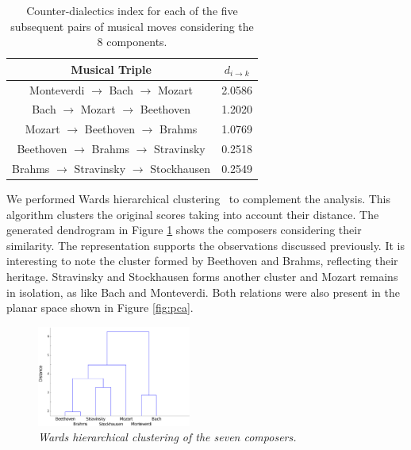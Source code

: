 \documentclass[
 aip,
 jmp,
 amsmath,amssymb,
 reprint,
]{revtex4-1}
\begin{document}
\begin{table}[ht]
\caption{\label{tab:tableE} Counter-dialectics index for each
of the five subsequent pairs of musical moves considering the 8 components.}

\begin{tabular}{|c||c|}
\hline
Musical Triple & $d_{i \rightarrow k}$ \\
\hline \hline

 Monteverdi $\to$ Bach $\to$ Mozart          & 2.0586 \\
 Bach $\to$ Mozart $\to$ Beethoven           & 1.2020 \\
 Mozart $\to$ Beethoven $\to$ Brahms         & 1.0769 \\
 Beethoven $\to$ Brahms $\to$ Stravinsky     & 0.2518 \\
 Brahms $\to$ Stravinsky $\to$ Stockhausen   & 0.2549 \\

\hline
\end{tabular}
\end{table}

We performed Wards hierarchical
clustering~\cite{Ward} to complement the analysis. This algorithm clusters the original scores taking into
account their distance. The generated dendrogram in
Figure \ref{fig:dendrogram} shows the composers
considering their similarity. The representation supports the
observations discussed previously. It is interesting to note the cluster
formed by Beethoven and Brahms, reflecting their heritage. Stravinsky
and Stockhausen forms another cluster and Mozart remains in isolation,
as like Bach and Monteverdi. Both relations were also present in the
planar space shown in Figure \ref{fig:pca}.

\begin{figure}[ht]
        \begin{center}
          \includegraphics[width=0.45\textwidth]{Clust_Compositores.eps}
        \end{center}
        \caption{\it Wards hierarchical clustering of the seven composers.}
        \label{fig:dendrogram}
\end{figure}
\end{document}
